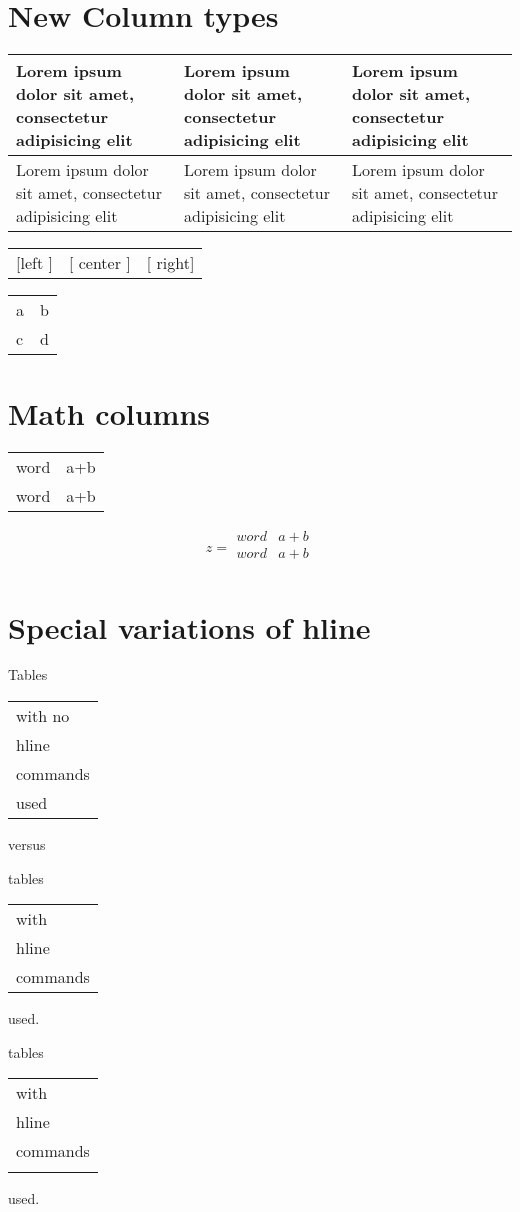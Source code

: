 \documentclass{article}
\begin{document}
\section{New Column types}
\begin{tabular}{|p{1in}|m{1in}|b{1in}|}\hline
Lorem ipsum dolor sit amet, consectetur adipisicing elit &
Lorem ipsum dolor sit amet, consectetur adipisicing elit &
Lorem ipsum dolor sit amet, consectetur adipisicing elit \\\hline
Lorem ipsum dolor sit amet, consectetur adipisicing elit &
Lorem ipsum dolor sit amet, consectetur adipisicing elit &
Lorem ipsum dolor sit amet, consectetur adipisicing elit \\
\hline
\end{tabular}

\begin{tabular}{|>{[}l<{]}|>{[}c<{]}|>{[}r<{]}|}
left & center & right\\
\end{tabular}

\begin{tabular}{l!{--}l}
  a & b \\
  c & d \\
\end{tabular}

\section{Math columns}
\begin{tabular}{cC}
word & a+b \\
word & a+b \\
\end{tabular}

\begin{equation}
z=
\begin{array}{Cc}
word & a+b \\
word & a+b \\
\end{array}
\end{equation}
\section{Special variations of hline}
Tables
\begin{tabular}[t]{l}
with no\\ hline \\ commands \\ used
\end{tabular} versus

tables
\begin{tabular}[t]{|l|}
\hline
with\\ hline \\ commands \\ 
\hline
\end{tabular} used.


tables
\begin{tabular}[t]{|l|}
\firsthline
with\\ hline \\ commands \\ 
\lasthline
\end{tabular} used.
\end{document}
